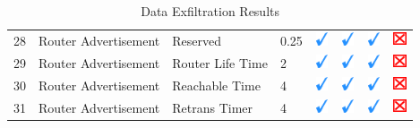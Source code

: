 \documentclass[12pt]{article}
\begin{document}
\begin{savenotes}
\begin{table}[!h]
{{\begin{tabular}{|C{1.0cm}|L{5.0cm}|L{5.0cm}|C{2.0cm}|C{1.0cm}|C{1.0cm}|C{1.0cm}|C{1.0cm}|}
28&Router Advertisement&Reserved&0.25&\includegraphics[width=4mm, height=4mm]{ok}&\includegraphics[width=4mm, height=4mm]{ok}&\includegraphics[width=4mm, height=4mm]{ok}&\includegraphics[width=4mm, height=4mm]{notok}\\
29&Router Advertisement&Router Life Time&2&\includegraphics[width=4mm, height=4mm]{ok}&\includegraphics[width=4mm, height=4mm]{ok}&\includegraphics[width=4mm, height=4mm]{ok}&\includegraphics[width=4mm, height=4mm]{notok}\\
30&Router Advertisement&Reachable Time&4&\includegraphics[width=4mm, height=4mm]{ok}&\includegraphics[width=4mm, height=4mm]{ok}&\includegraphics[width=4mm, height=4mm]{ok}&\includegraphics[width=4mm, height=4mm]{notok}\\
31&Router Advertisement&Retrans Timer&4&\includegraphics[width=4mm, height=4mm]{ok}&\includegraphics[width=4mm, height=4mm]{ok}&\includegraphics[width=4mm, height=4mm]{ok}&\includegraphics[width=4mm, height=4mm]{notok}\\
\hline
\end{tabular}}}
\caption{Data Exfiltration Results}
\label{table:exfiltrationResults1}
\end{table}
\end{savenotes}
\end{document}
